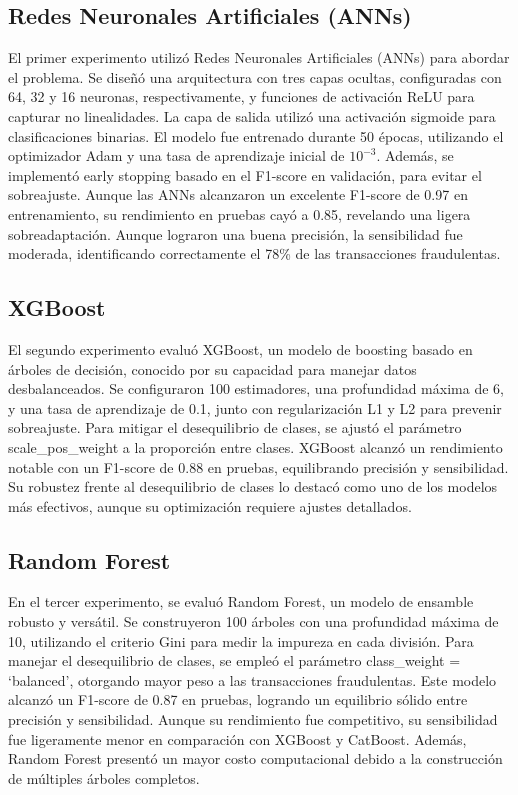 \documentclass[9pt,a4paper,twoside]{rho-class/rho}
\begin{document}
        \subsection{Redes Neuronales Artificiales (ANNs)}
            El primer experimento utilizó Redes Neuronales Artificiales (ANNs) para abordar el problema. Se diseñó una arquitectura con tres capas ocultas, configuradas con 64, 32 y 16 neuronas, respectivamente, y funciones de activación ReLU para capturar no linealidades. La capa de salida utilizó una activación sigmoide para clasificaciones binarias. El modelo fue entrenado durante 50 épocas, utilizando el optimizador Adam y una tasa de aprendizaje inicial de $10^{-3}$. Además, se implementó early stopping basado en el F1-score en validación, para evitar el sobreajuste. Aunque las ANNs alcanzaron un excelente F1-score de 0.97 en entrenamiento, su rendimiento en pruebas cayó a 0.85, revelando una ligera sobreadaptación. Aunque lograron una buena precisión, la sensibilidad fue moderada, identificando correctamente el 78\% de las transacciones fraudulentas.
        
        \subsection{XGBoost}
            El segundo experimento evaluó XGBoost, un modelo de boosting basado en árboles de decisión, conocido por su capacidad para manejar datos desbalanceados. Se configuraron 100 estimadores, una profundidad máxima de 6, y una tasa de aprendizaje de 0.1, junto con regularización L1 y L2 para prevenir sobreajuste. Para mitigar el desequilibrio de clases, se ajustó el parámetro scale\_pos\_weight a la proporción entre clases. XGBoost alcanzó un rendimiento notable con un F1-score de 0.88 en pruebas, equilibrando precisión y sensibilidad. Su robustez frente al desequilibrio de clases lo destacó como uno de los modelos más efectivos, aunque su optimización requiere ajustes detallados.

        \subsection{Random Forest}
            En el tercer experimento, se evaluó Random Forest, un modelo de ensamble robusto y versátil. Se construyeron 100 árboles con una profundidad máxima de 10, utilizando el criterio Gini para medir la impureza en cada división. Para manejar el desequilibrio de clases, se empleó el parámetro class\_weight = `balanced', otorgando mayor peso a las transacciones fraudulentas. Este modelo alcanzó un F1-score de 0.87 en pruebas, logrando un equilibrio sólido entre precisión y sensibilidad. Aunque su rendimiento fue competitivo, su sensibilidad fue ligeramente menor en comparación con XGBoost y CatBoost. Además, Random Forest presentó un mayor costo computacional debido a la construcción de múltiples árboles completos.
\end{document}
